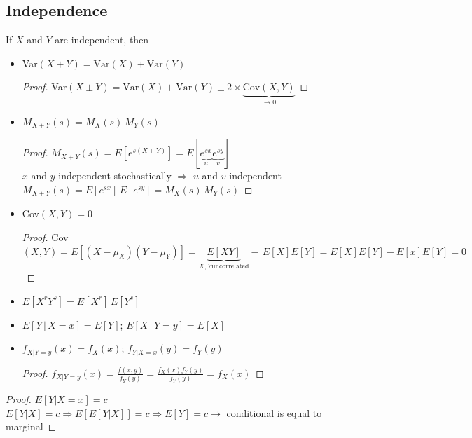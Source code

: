 \subsection{Independence}
If $X$ and $Y$ are independent, then
\begin{itemize}
    \item Var$(X+Y) = \text{Var}(X) + \text{Var}(Y)$
        \begin{proof}
            Var$(X\pm Y)=\text{Var}(X)+\text{Var}(Y) \pm 2\times \underbrace{\text{Cov}(X,Y)}_{\rightarrow 0}$
        \end{proof}
    \item $M_{X+Y}(s) = M_X(s)\,M_Y(s)$
        \begin{proof}
            $M_{X+Y}(s) = E[e^{s(X+Y)}] = E[\underbrace{e^{sx}}_{u}\underbrace{e^{sy}}_{v}]$\\

            $x$ and $y$ independent stochastically $\Rightarrow$ $u$ and $v$ independent\\

            $M_{X+Y}(s) = E[e^{sx}]\,E[e^{sy}] = M_X(s)\,M_Y(s)$
        \end{proof}
    \item Cov$(X,Y) = 0$
        \begin{proof}
            Cov$(X,Y) = E[(X-\mu_X)(Y-\mu_Y)] = \underbrace{E[XY]}_{X, Y \text{uncorrelated}}-\,E[X]E[Y]=E[X]E[Y]-E[x]E[Y]=0$
        \end{proof}
    \item $E[X^r Y^s] = E[X^r]\, E[Y^s]$
    \item $E[Y\,|\,X=x] = E[Y]$; $E[X\, |\, Y=y] = E[X]$
    \item $f_{X|Y=y}(x)=f_X(x)$; $f_{Y|X=x}(y)=f_Y(y)$
        \begin{proof}
            $\displaystyle f_{X|Y=y}(x) = \frac{f(x,y)}{f_Y(y)} = \frac{f_X(x)f_Y(y)}{f_Y(y)}=f_X(x)$
        \end{proof}
\end{itemize}
\begin{proof}
    $E[Y|X=x] = c$\\

    $E[Y|X] = c \Rightarrow E[E[Y|X]] = c \Rightarrow E[Y]=c\rightarrow$ conditional is equal to marginal
\end{proof}

